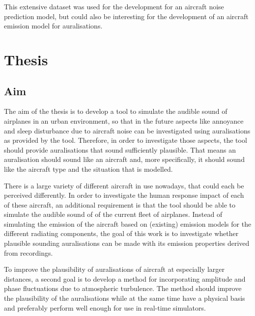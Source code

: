 This extensive dataset was used for the development for an aircraft noise
prediction model, but could also be interesting for the development of an
aircraft emission model for auralisations.

\newpage
\section{Thesis}


\subsection{Aim}


The aim of the thesis is to develop a tool to simulate the audible sound of
airplanes in an urban environment, so that in the future aspects like annoyance
and sleep disturbance due to aircraft noise can be investigated using
auralisations as provided by the tool. Therefore, in order to investigate those aspects,
the tool should provide auralisations that sound sufficiently plausible.
That means an auralisation should sound like an aircraft and, more specifically,
it should sound like the aircraft type and the situation that is modelled.

There is a large variety of different aircraft in use nowadays, that could each
be perceived differently. In order to investigate the human response impact of
each of these aircraft, an additional requirement is that the tool should be
able to simulate the audible sound of of the current fleet of airplanes. Instead
of simulating the emission of the aircraft based on (existing) emission models
for the different radiating components, the goal of this work is to investigate
whether plausible sounding auralisations can be made with its emission
properties derived from recordings.

To improve the plausibility of auralisations of aircraft at especially larger
distances, a second goal is to develop a method for incorporating amplitude and
phase fluctuations due to atmospheric turbulence. The method should improve the
plausibility of the auralisations while at the same time have a physical basis
and preferably perform well enough for use in real-time simulators.


